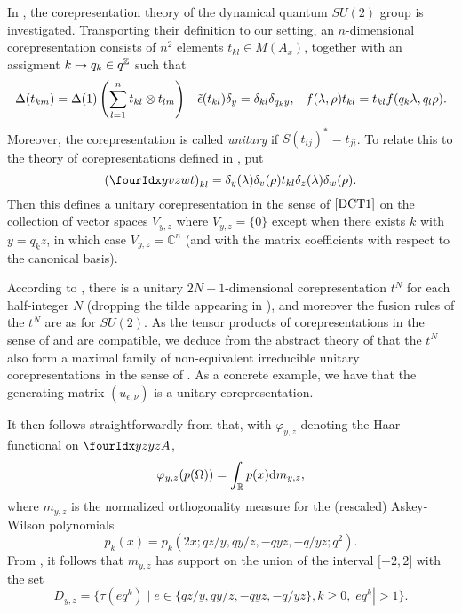 In \cite{KoR1}, the corepresentation theory of the dynamical quantum $SU(2)$ group is investigated. Transporting their definition to our setting, an $n$-dimensional corepresentation consists of $n^2$ elements $t_{kl} \in M(A_x)$, together with an assigment $k \mapsto q_k \in q^{\mathbb{Z}}$ such that \begin{align*} \Delta(t_{km}) = \Delta(1)\left(\sum_{l=1}^n t_{kl}\otimes t_{lm}\right)&& \operatorname{\tilde{\epsilon}}(t_{kl})\delta_y = \delta_{kl} \delta_{q_ky},&& f(\lambda,\rho)t_{kl} = t_{kl}f(q_k\lambda,q_l\rho).\end{align*} Moreover, the corepresentation is called \emph{unitary} if $S(t_{ij})^* =t_{ji}$. To relate this to the theory of corepresentations defined in \cite{DCT1}, put \[\left(\Gr{t}{y}{z}{v}{w}\right)_{kl} = \delta_{y}(\lambda)\delta_v(\rho) t_{kl} \delta_{z}(\lambda)\delta_{w}(\rho).\] Then this defines a unitary corepresentation in the sense of $\cite{DCT1}$ on the collection of vector spaces $V_{y,z}$ where $V_{y,z}=\{0\}$ except when there exists $k$ with $y = q_kz$,  in which case $V_{y,z} = \mathbb{C}^n$ (and with the matrix coefficients with respect to the canonical basis). 

According to \cite{KoR1}, there is a unitary $2N+1$-dimensional corepresentation $t^N$ for each half-integer $N$ (dropping the tilde appearing in \cite{KoR1}), and moreover the fusion rules of the $t^N$ are as for $SU(2)$. As the tensor products of corepresentations in the sense of \cite{KoR1} and \cite{DCT1} are compatible, we deduce from the abstract theory of \cite{DCT1} that the $t^N$ also form a maximal family of non-equivalent irreducible unitary corepresentations in the sense of \cite{DCT1}. %
As a concrete example, we have that the generating matrix $(u_{\epsilon,\nu})$ is a unitary corepresentation.


It then follows straightforwardly from \cite[Section 7]{KoR1} that, with $\varphi_{y,z}$ denoting the Haar functional on $\Gr{A}{y}{y}{z}{z}$, \[\varphi_{y,z}(p(\Omega)) = \int_{\mathbb{R}} p(x)\mathrm{d} m_{y,z},\] where $m_{y,z}$ is the normalized orthogonality measure for the (rescaled) Askey-Wilson polynomials \[p_k(x) = p_k(2x;qz/y,qy/z,-qyz,-q/yz;q^2).\]  From \cite[Theorem 2.1 and Theorem 2.5]{AsW1}%
, it follows that $m_{y,z}$ has support on the union of the interval $\lbrack -2,2\rbrack$ with the set \[D_{y,z} = \{\tau(eq^k)\mid e\in \{qz/y,qy/z,-qyz,-q/yz\}, k\geq 0, |eq^k|>1\}.\]

